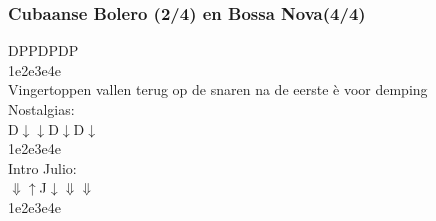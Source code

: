 \subsubsection*{Cubaanse Bolero (2/4) en Bossa Nova(4/4)}
D\hspace{1.8em}P\hspace{1.8em}\hphantom{D}\hspace{1.9em}P\hspace{1.8em}D\hspace{1.8em}P\hspace{1.8em}D\hspace{1.9em}P\\
1\hspace{2em}e\hspace{2em}2\hspace{2em}e\hspace{2em}3\hspace{2em}e\hspace{2em}4\hspace{2em}e\\
Vingertoppen vallen terug op de snaren na de eerste è voor demping\\
Nostalgias:\\
D\hspace{1.8em}$\downarrow$\hspace{2em}\hphantom{a}\hspace{2em}$\downarrow$\hspace{2em}D\hspace{1.8em}$\downarrow$\hspace{2em}D\hspace{2em}$\downarrow$\\
1\hspace{2em}e\hspace{2em}2\hspace{2em}e\hspace{2em}3\hspace{2em}e\hspace{2em}4\hspace{2em}e\\

Intro Julio:\\
$\Downarrow$\hspace{2em}$\uparrow$\hspace{2em}J\hspace{2em}$\downarrow$\hspace{2em}$\Downarrow$\hspace{2em}\hphantom{$\Downarrow$}\hspace{2em}$\Downarrow$\hspace{2em}\\
1\hspace{2em}e\hspace{2em}2\hspace{2em}e\hspace{2em}3\hspace{2em}e\hspace{2em}4\hspace{2em}e\\

